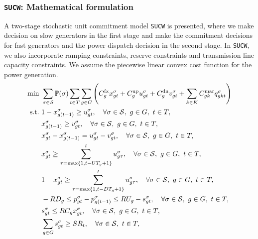 \subsubsection{\texttt{SUCW}: Mathematical formulation}
A two-stage stochastic unit commitment model \texttt{SUCW} is presented, where we make decision on slow generators in the first stage and make the commitment decisions for fast generators and the power dispatch decision in the second stage. In \texttt{SUCW}, we also incorporate ramping constraints, reserve constraints and transmission line capacity constraints. We assume the piecewise linear convex cost function for the power generation.
\begin{subequations}
	\begin{align}
	\min \ & \sum_{\sigma \in \mathcal{S}} \PP(\sigma) \sum_{t\in T} \sum_{g\in G}\left( C^\text{fx}_g x_{gt}^\sigma + C^\text{up}_g u_{gt}^\sigma  + C^\text{dn}_g v_{gt}^\sigma  + \sum_{k\in K} C^\text{mar}_{gk} q_{gkt}^\sigma\right) \label{sucw:obj}\\
	\text{s.t.} \
	& 1 - x_{g(t-1)}^\sigma \geq u_{gt}^\sigma , \quad \forall \sigma \in \mathcal{S},\ g\in G,\ t\in T, \label{sucw:b} \\
	& x_{g(t-1)}^\sigma \geq v_{gt}^\sigma , \quad \forall \sigma \in \mathcal{S},\ g\in G,\ t\in T, \label{sucw:c} \\
	& x_{gt}^\sigma - x_{g(t-1)}^\sigma = u_{gt}^\sigma  - v_{gt}^\sigma , \quad \forall \sigma \in \mathcal{S},\ g\in G,\ t\in T, \label{sucw:d} \\
	& x_{gt}^\sigma \geq \sum_{\tau=\max\{1,t-UT_g+1\}}^t u_{g\tau}^\sigma, \quad \forall \sigma \in \mathcal{S},\ g\in G,\ t\in T, \label{sucw:e} \\
	& 1 - x_{gt}^\sigma \geq \sum_{\tau=\max\{1,t-DT_g+1\}}^t u_{g\tau}^\sigma,\quad \forall \sigma \in \mathcal{S},\ g\in G,\ t\in T, \label{sucw:f} \\
	& -RD_g \leq p_{gt}^\sigma - p_{g(t-1)}^\sigma \leq RU_g - s_{gt}^\sigma, \quad \forall \sigma \in \mathcal{S},\ g\in G,\ t\in T, \label{sucw:g} \\
	& s_{gt}^\sigma \leq RC_g x_{gt}^\sigma, \quad \forall \sigma \in \mathcal{S},\ g\in G,\ t\in T, \label{sucw:h} \\
	& \sum_{g\in G} s_{gt}^\sigma \geq SR_t, \quad \forall \sigma \in \mathcal{S},\ t\in T,\ \label{sucw:i} \\

\end{align}
\end{subequations}
